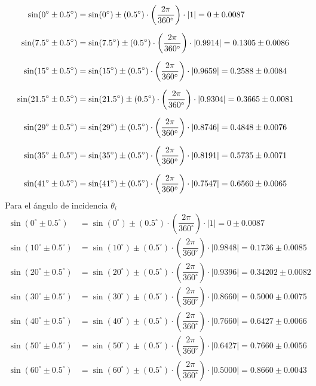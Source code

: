 \documentclass[12pt,a4paper]{article}
\begin{document}
\begin{align*}
	\footnotesize
	\sin(0^{\circ}\pm0.5^{\circ})&    = \sin(0^{\circ})\pm(0.5^{\circ})\cdot\left(\dfrac{2\pi}{360^{\circ}}\right)\cdot|1|            = 0\pm0.0087\\[2mm]
	\sin(7.5^{\circ}\pm0.5^{\circ})&  = \sin(7.5^{\circ})\pm(0.5^{\circ})\cdot\left(\dfrac{2\pi}{360^{\circ}}\right)\cdot|0.9914|  = 0.1305\pm0.0086\\[2mm]
	\sin(15^{\circ}\pm0.5^{\circ})&   = \sin(15^{\circ})\pm(0.5^{\circ})\cdot\left(\dfrac{2\pi}{360^{\circ}}\right)\cdot|0.9659|  = 0.2588\pm0.0084\\[2mm]
	\sin(21.5^{\circ}\pm0.5^{\circ})& = \sin(21.5^{\circ})\pm(0.5^{\circ})\cdot\left(\dfrac{2\pi}{360^{\circ}}\right)\cdot|0.9304|  = 0.3665\pm0.0081\\[2mm]
	\sin(29^{\circ}\pm0.5^{\circ})&   = \sin(29^{\circ})\pm(0.5^{\circ})\cdot\left(\dfrac{2\pi}{360^{\circ}}\right)\cdot|0.8746|  = 0.4848\pm0.0076\\[2mm]
	\sin(35^{\circ}\pm0.5^{\circ})&   = \sin(35^{\circ})\pm(0.5^{\circ})\cdot\left(\dfrac{2\pi}{360^{\circ}}\right)\cdot|0.8191|  = 0.5735\pm0.0071\\[2mm]
	\sin(41^{\circ}\pm0.5^{\circ})&   = \sin(41^{\circ})\pm(0.5^{\circ})\cdot\left(\dfrac{2\pi}{360^{\circ}}\right)\cdot|0.7547|  = 0.6560\pm0.0065
\end{align*}
Para el ángulo de incidencia $\theta_i$
\begin{align*}
	\sin(0^{\circ}\pm0.5^{\circ})&   =\sin(0^{\circ})\pm(0.5^{\circ})\cdot\left(\dfrac{2\pi}{360^{\circ}}\right)\cdot|1|             =0\pm0.0087\\[2mm]
	\sin(10^{\circ}\pm0.5^{\circ})&  =\sin(10^{\circ})\pm(0.5^{\circ})\cdot\left(\dfrac{2\pi}{360^{\circ}}\right)\cdot|0.9848|   =0.1736\pm0.0085\\[2mm]
	\sin(20^{\circ}\pm0.5^{\circ})&  =\sin(20^{\circ})\pm(0.5^{\circ})\cdot\left(\dfrac{2\pi}{360^{\circ}}\right)\cdot|0.9396|  =0.34202\pm0.0082\\[2mm]
	\sin(30^{\circ}\pm0.5^{\circ})&  =\sin(30^{\circ})\pm(0.5^{\circ})\cdot\left(\dfrac{2\pi}{360^{\circ}}\right)\cdot|0.8660|   =0.5000\pm0.0075\\[2mm]
	\sin(40^{\circ}\pm0.5^{\circ})&  =\sin(40^{\circ})\pm(0.5^{\circ})\cdot\left(\dfrac{2\pi}{360^{\circ}}\right)\cdot|0.7660|   =0.6427\pm0.0066\\[2mm]
	\sin(50^{\circ}\pm0.5^{\circ})&  =\sin(50^{\circ})\pm(0.5^{\circ})\cdot\left(\dfrac{2\pi}{360^{\circ}}\right)\cdot|0.6427|   =0.7660\pm0.0056\\[2mm]
	\sin(60^{\circ}\pm0.5^{\circ})&  =\sin(60^{\circ})\pm(0.5^{\circ})\cdot\left(\dfrac{2\pi}{360^{\circ}}\right)\cdot|0.5000|   =0.8660\pm0.0043
\end{align*}
\end{document}
